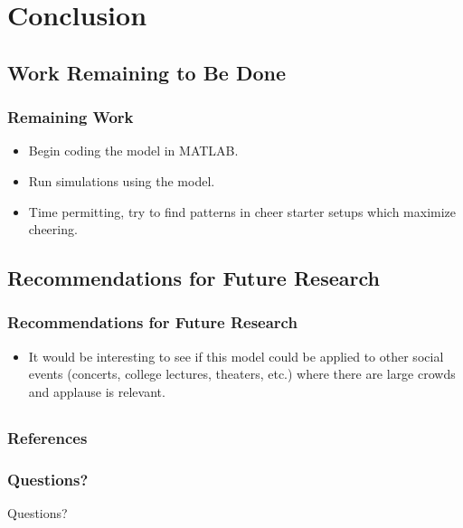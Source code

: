 \documentclass[compress,handout,10pt]{beamer}
\let\olditem\item
\renewcommand{\item}{\setlength{\itemsep}{0.5\baselineskip}\olditem}
\begin{document}
\section{Conclusion}

\subsection{Work Remaining to Be Done}

\begin{frame}
	\frametitle{Remaining Work}
	\begin {itemize}
		\item Begin coding the model in MATLAB.
		\item Run simulations using the model.
		\item Time permitting, try to find patterns in cheer starter setups which maximize cheering.
	\end {itemize}
\end{frame}

\subsection{Recommendations for Future Research}

\begin{frame}
	\frametitle {Recommendations for Future Research}
	\begin {itemize}
		\item It would be interesting to see if this model could be applied to other social events (concerts, college lectures, theaters, etc.) where there are large crowds and applause is relevant.
	\end {itemize}
\end{frame}

\subsection{}

\begin {frame}
	\frametitle{References}
	
	
\end {frame}

\begin{frame}
	\frametitle {Questions?}
	\begin{center}
		Questions?
	\end{center}
\end{frame}
\end{document}
